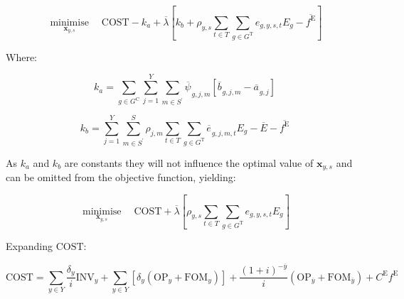 \documentclass{article}
\newcommand{\sGeneratorsCandidate}{G^{\mathrm{C}}}
\newcommand{\sGeneratorsThermal}{G^{\mathrm{T}}}
\newcommand{\sYears}{Y}
\newcommand{\sScenarios}{S}
\newcommand{\sIntervals}{T}
\newcommand{\iGenerator}{g}
\newcommand{\iYear}{y}
\newcommand{\iYearTerminal}{\overline{\iYear}}
\newcommand{\iYearAlias}{j}
\newcommand{\iScenario}{s}
\newcommand{\iScenarioAlias}{m}
\newcommand{\iInterval}{t}
\newcommand{\cOperatingCost}[1][\iYear,\iScenario]{\mathrm{OP}_{#1}}
\newcommand{\cFixedOperationsMaintenanceCost}[1][\iYear]{\mathrm{FOM}_{#1}}
\newcommand{\cScenarioDuration}[1][\iYear,\iScenario]{\rho_{#1}}
\newcommand{\cEmissionsIntensity}[1][\iGenerator]{E_{#1}}
\newcommand{\cInvestmentCost}[1][\iYear]{\mathrm{INV}_{#1}}
\newcommand{\cInterestRate}{i}
\newcommand{\cEmmissionsCumulativeTarget}{\overline{E}}
\newcommand{\cEmissionsTargetViolationPenalty}{C^{\mathrm{E}}}
\newcommand{\cObjectiveFunction}{\mathrm{COST}}
\newcommand{\cDiscountRate}[1][\iYear]{\delta_{#1}}
\newcommand{\vEnergy}[1][\iGenerator,\iYear,\iScenario,\iInterval]{e_{#1}}
\newcommand{\vEmissionsTargetViolation}{f^{\mathrm{E}}}
\newcommand{\vInstalledCapacityTotal}[1][\iGenerator,\iYear]{a_{#1}}
\newcommand{\vInstalledCapacityTotalScenario}[1][\iGenerator,\iYear,\iScenario]{b_{#1}}
\newcommand{\vFixedCapacityDual}[1][\iGenerator,\iYear,\iScenario]{\psi_{#1}}
\DeclareMathOperator*{\minimise}{minimise}
\begin{document}
\begin{equation}
	\minimise\limits_{\bm{x}_{\iYear,\iScenario}} \quad\cObjectiveFunction - k_{a} + \overline{\lambda} \left[k_{b} + \cScenarioDuration\sum\limits_{\iInterval \in \sIntervals}\sum\limits_{\iGenerator \in \sGeneratorsThermal} \vEnergy[\iGenerator,\iYear,\iScenario,\iInterval] \cEmissionsIntensity - \overline{\vEmissionsTargetViolation}\right]
\end{equation}

Where:

\begin{equation}
	k_{a} = \sum\limits_{\iGenerator \in \sGeneratorsCandidate}\sum\limits_{\iYearAlias=1}^{\sYears}\sum\limits_{\iScenarioAlias \in\sScenarios^{\prime}}\overline{\vFixedCapacityDual[]}_{\iGenerator,\iYearAlias,\iScenarioAlias}\left[\overline{\vInstalledCapacityTotalScenario[]}_{\iGenerator,\iYearAlias,\iScenarioAlias} - \overline{\vInstalledCapacityTotal[]}_{\iGenerator,\iYearAlias}\right]
\end{equation}

\begin{equation}
	k_{b} = \sum\limits_{\iYearAlias=1}^{\sYears} \sum\limits_{\iScenarioAlias \in \sScenarios^{\prime}}^{\sScenarios} \cScenarioDuration[\iYearAlias,\iScenarioAlias] \sum\limits_{\iInterval \in \sIntervals} \sum\limits_{\iGenerator \in \sGeneratorsThermal} \overline{\vEnergy[]}_{\iGenerator,\iYearAlias,\iScenarioAlias,\iInterval} \cEmissionsIntensity - \cEmmissionsCumulativeTarget - \overline{\vEmissionsTargetViolation}
\end{equation}

As $k_{a}$ and $k_{b}$ are constants they will not influence the optimal value of $\bm{x}_{\iYear,\iScenario}$ and can be omitted from the objective function, yielding:

\begin{equation}
	\minimise\limits_{\bm{x}_{\iYear,\iScenario}} \quad \cObjectiveFunction + \overline{\lambda} \left[\cScenarioDuration\sum\limits_{\iInterval \in \sIntervals}\sum\limits_{\iGenerator \in \sGeneratorsThermal} \vEnergy[\iGenerator,\iYear,\iScenario,\iInterval] \cEmissionsIntensity \right]
\end{equation}

Expanding $\cObjectiveFunction$:

\begin{equation}
	\cObjectiveFunction = \sum\limits_{\iYear \in \sYears} \frac{\cDiscountRate}{\cInterestRate}\cInvestmentCost + \sum\limits_{\iYear \in \sYears} \left[\cDiscountRate (\cOperatingCost[\iYear] + \cFixedOperationsMaintenanceCost) \right] + \frac{(1+\cInterestRate)^{-\iYearTerminal}}{\cInterestRate} \left(\cOperatingCost[\iYearTerminal] + \cFixedOperationsMaintenanceCost[\iYearTerminal] \right) + \cEmissionsTargetViolationPenalty \vEmissionsTargetViolation
\end{equation}
\end{document}

